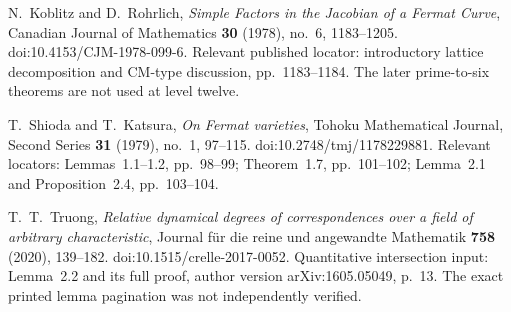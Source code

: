 N.~Koblitz and D.~Rohrlich,
\emph{Simple Factors in the Jacobian of a Fermat Curve},
Canadian Journal of Mathematics \textbf{30} (1978), no.~6, 1183--1205.
doi:10.4153/CJM-1978-099-6.
Relevant published locator: introductory lattice decomposition and CM-type
discussion, pp.~1183--1184. The later prime-to-six theorems are not used at
level twelve.

T.~Shioda and T.~Katsura,
\emph{On Fermat varieties},
Tohoku Mathematical Journal, Second Series \textbf{31} (1979), no.~1, 97--115.
doi:10.2748/tmj/1178229881.
Relevant locators: Lemmas~1.1--1.2, pp.~98--99;
Theorem~1.7, pp.~101--102; Lemma~2.1 and Proposition~2.4, pp.~103--104.

T.~T.~Truong,
\emph{Relative dynamical degrees of correspondences over a field of
arbitrary characteristic},
Journal f\"ur die reine und angewandte Mathematik
\textbf{758} (2020), 139--182.
doi:10.1515/crelle-2017-0052.
Quantitative intersection input: Lemma~2.2 and its full proof,
author version arXiv:1605.05049, p.~13.
The exact printed lemma pagination was not independently verified.
